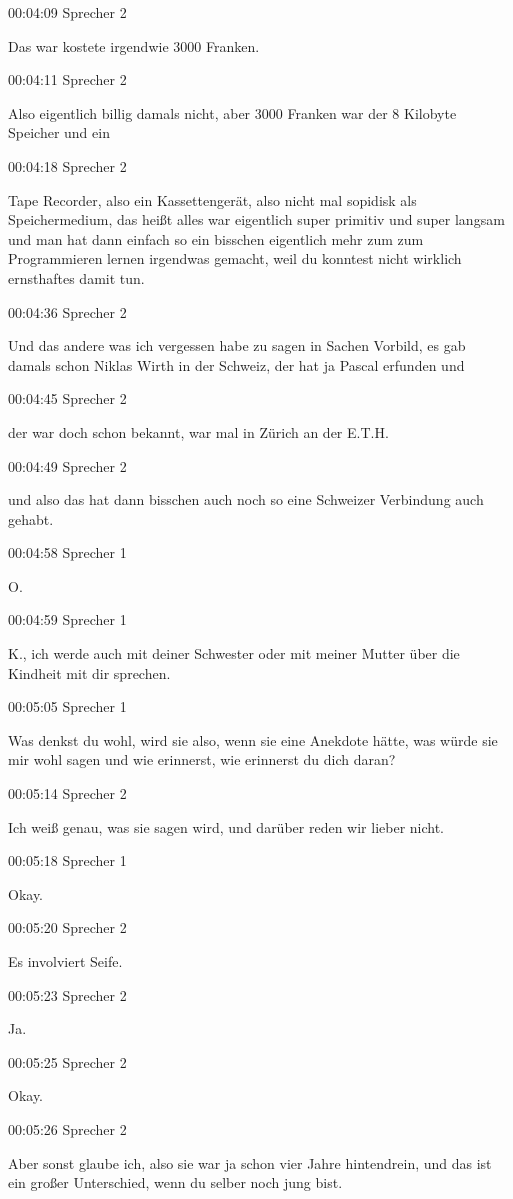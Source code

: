 00:04:09 Sprecher 2

Das war kostete irgendwie 3000 Franken.

00:04:11 Sprecher 2

Also eigentlich billig damals nicht, aber 3000 Franken war der 8
Kilobyte Speicher und ein

00:04:18 Sprecher 2

Tape Recorder, also ein Kassettengerät, also nicht mal sopidisk als
Speichermedium, das heißt alles war eigentlich super primitiv und super
langsam und man hat dann einfach so ein bisschen eigentlich mehr zum zum
Programmieren lernen irgendwas gemacht, weil du konntest nicht wirklich
ernsthaftes damit tun.

00:04:36 Sprecher 2

Und das andere was ich vergessen habe zu sagen in Sachen Vorbild, es gab
damals schon Niklas Wirth in der Schweiz, der hat ja Pascal erfunden und

00:04:45 Sprecher 2

der war doch schon bekannt, war mal in Zürich an der E.T.H.

00:04:49 Sprecher 2

und also das hat dann bisschen auch noch so eine Schweizer Verbindung
auch gehabt.

00:04:58 Sprecher 1

O.

00:04:59 Sprecher 1

K., ich werde auch mit deiner Schwester oder mit meiner Mutter über die
Kindheit mit dir sprechen.

00:05:05 Sprecher 1

Was denkst du wohl, wird sie also, wenn sie eine Anekdote hätte, was
würde sie mir wohl sagen und wie erinnerst, wie erinnerst du dich daran?

00:05:14 Sprecher 2

Ich weiß genau, was sie sagen wird, und darüber reden wir lieber nicht.

00:05:18 Sprecher 1

Okay.

00:05:20 Sprecher 2

Es involviert Seife.

00:05:23 Sprecher 2

Ja.

00:05:25 Sprecher 2

Okay.

00:05:26 Sprecher 2

Aber sonst glaube ich, also sie war ja schon vier Jahre hintendrein, und
das ist ein großer Unterschied, wenn du selber noch jung bist.

